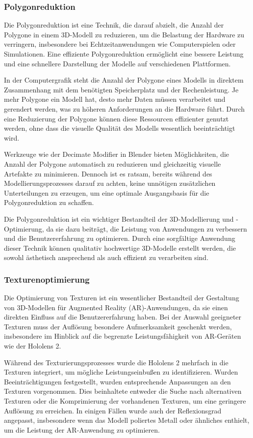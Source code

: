 \subsubsection{Polygonreduktion}
Die Polygonreduktion ist eine Technik, die darauf abzielt, die Anzahl der Polygone in einem 3D-Modell zu reduzieren, um
die Belastung der Hardware zu verringern, insbesondere bei Echtzeitanwendungen wie Computerspielen oder Simulationen.
Eine effiziente Polygonreduktion ermöglicht eine bessere Leistung und eine schnellere Darstellung der Modelle auf
verschiedenen Plattformen.

In der Computergrafik steht die Anzahl der Polygone eines Modells in direktem Zusammenhang mit dem benötigten Speicherplatz
und der Rechenleistung. Je mehr Polygone ein Modell hat, desto mehr Daten müssen verarbeitet und gerendert werden, was
zu höheren Anforderungen an die Hardware führt. Durch eine Reduzierung der Polygone können diese Ressourcen effizienter
genutzt werden, ohne dass die visuelle Qualität des Modells wesentlich beeinträchtigt wird.

Werkzeuge wie der Decimate Modifier in Blender bieten Möglichkeiten, die Anzahl der Polygone automatisch zu reduzieren
und gleichzeitig visuelle Artefakte zu minimieren. Dennoch ist es ratsam, bereits während des Modellierungsprozesses
darauf zu achten, keine unnötigen zusätzlichen Unterteilungen zu erzeugen, um eine optimale Ausgangsbasis für die
Polygonreduktion zu schaffen.

Die Polygonreduktion ist ein wichtiger Bestandteil der 3D-Modellierung und -Optimierung, da sie dazu beiträgt, die Leistung
von Anwendungen zu verbessern und die Benutzererfahrung zu optimieren. Durch eine sorgfältige Anwendung dieser Technik
können qualitativ hochwertige 3D-Modelle erstellt werden, die sowohl ästhetisch ansprechend als auch effizient zu verarbeiten
sind.

\subsubsection{Texturenoptimierung}
Die Optimierung von Texturen ist ein wesentlicher Bestandteil der Gestaltung von 3D-Modellen für Augmented Reality
(AR)-Anwendungen, da sie einen direkten Einfluss auf die Benutzererfahrung haben. Bei der Auswahl geeigneter Texturen
muss der Auflösung besondere Aufmerksamkeit geschenkt werden, insbesondere im Hinblick auf die begrenzte Leistungsfähigkeit
von AR-Geräten wie der Hololens 2.

Während des Texturierungsprozesses wurde die Hololens 2 mehrfach in die Texturen integriert, um mögliche Leistungseinbußen
zu identifizieren. Wurden Beeinträchtigungen festgestellt, wurden entsprechende Anpassungen an den Texturen vorgenommen.
Dies beinhaltete entweder die Suche nach alternativen Texturen oder die Komprimierung der vorhandenen Texturen, um eine
geringere Auflösung zu erreichen. In einigen Fällen wurde auch der Reflexionsgrad angepasst, insbesondere wenn das Modell
poliertes Metall oder ähnliches enthielt, um die Leistung der AR-Anwendung zu optimieren.

